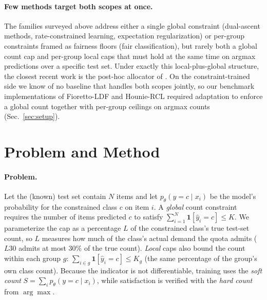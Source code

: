 \documentclass[10pt]{article}
\begin{document}
\paragraph{Few methods target both scopes at once.}
The families surveyed above address either a single global constraint
(dual-ascent methods, rate-constrained learning, expectation
regularization) or per-group constraints framed as fairness floors (fair
classification), but rarely both a global count cap and per-group local
caps that must hold at the same time on argmax predictions over a
specific test set. Under exactly this local-plus-global structure, the
closest recent work is the post-hoc allocator of
\citet{shifman2025classification}. On the constraint-trained side we
know of no baseline that handles both scopes jointly, so our benchmark
implementations of Fioretto-LDF and Hounie-RCL required adaptation to
enforce a global count together with per-group ceilings on argmax
counts (Sec.~\ref{sec:setup}).

\section{Problem and Method}
\label{sec:method}

\paragraph{Problem.}
Let the (known) test set contain $N$ items and let $p_\theta(y=c\mid x_i)$ be
the model's probability for the constrained class $c$ on item $i$. A
\emph{global} count constraint requires the number of items predicted $c$ to
satisfy $\sum_{i=1}^{N}\mathbf{1}[\hat y_i = c] \le K$. We parameterize the
cap as a percentage $L$ of the constrained class's true test-set count, so
$L$ measures how much of the class's actual demand the quota admits ($L30$
admits at most $30\%$ of the true count). \emph{Local} caps also bound the
count within each group $g$: $\sum_{i\in g}\mathbf{1}[\hat y_i=c]\le K_g$
(the same percentage of the group's own class count). Because the indicator
is not differentiable, training uses the \emph{soft count}
$S=\sum_i p_\theta(y=c\mid x_i)$, while satisfaction is verified with the
\emph{hard count} from $\arg\max$.
\end{document}
